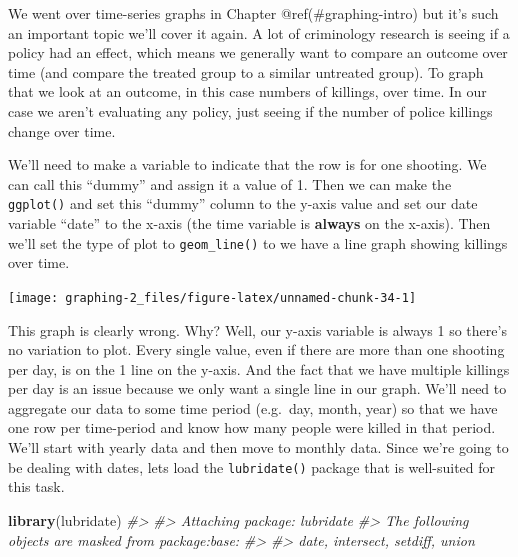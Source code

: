 \documentclass[
  12pt,
]{book}
\newenvironment{Shaded}{\begin{snugshade}}{\end{snugshade}}
\newcommand{\CommentTok}[1]{\textcolor[rgb]{0.56,0.35,0.01}{\textit{#1}}}
\newcommand{\DataTypeTok}[1]{\textcolor[rgb]{0.13,0.29,0.53}{#1}}
\newcommand{\DecValTok}[1]{\textcolor[rgb]{0.00,0.00,0.81}{#1}}
\newcommand{\KeywordTok}[1]{\textcolor[rgb]{0.13,0.29,0.53}{\textbf{#1}}}
\newcommand{\NormalTok}[1]{#1}
\newcommand{\OperatorTok}[1]{\textcolor[rgb]{0.81,0.36,0.00}{\textbf{#1}}}
\newcommand{\StringTok}[1]{\textcolor[rgb]{0.31,0.60,0.02}{#1}}
\begin{document}
We went over time-series graphs in Chapter @ref(\#graphing-intro) but it's such an important topic we'll cover it again. A lot of criminology research is seeing if a policy had an effect, which means we generally want to compare an outcome over time (and compare the treated group to a similar untreated group). To graph that we look at an outcome, in this case numbers of killings, over time. In our case we aren't evaluating any policy, just seeing if the number of police killings change over time.

We'll need to make a variable to indicate that the row is for one shooting. We can call this ``dummy'' and assign it a value of 1. Then we can make the \texttt{ggplot()} and set this ``dummy'' column to the y-axis value and set our date variable ``date'' to the x-axis (the time variable is \textbf{always} on the x-axis). Then we'll set the type of plot to \texttt{geom\_line()} to we have a line graph showing killings over time.

\begin{Shaded}
\end{Shaded}

\begin{center}\texttt{[image: graphing-2\_files/figure-latex/unnamed-chunk-34-1]} \end{center}

This graph is clearly wrong. Why? Well, our y-axis variable is always 1 so there's no variation to plot. Every single value, even if there are more than one shooting per day, is on the 1 line on the y-axis. And the fact that we have multiple killings per day is an issue because we only want a single line in our graph. We'll need to aggregate our data to some time period (e.g.~day, month, year) so that we have one row per time-period and know how many people were killed in that period. We'll start with yearly data and then move to monthly data. Since we're going to be dealing with dates, lets load the \texttt{lubridate()} package that is well-suited for this task.

\begin{Shaded}
\begin{Highlighting}[]
\KeywordTok{library}\NormalTok{(lubridate)}
\CommentTok{\#> }
\CommentTok{\#> Attaching package: \textquotesingle{}lubridate\textquotesingle{}}
\CommentTok{\#> The following objects are masked from \textquotesingle{}package:base\textquotesingle{}:}
\CommentTok{\#> }
\CommentTok{\#>     date, intersect, setdiff, union}
\end{Highlighting}
\end{Shaded}
\end{document}
